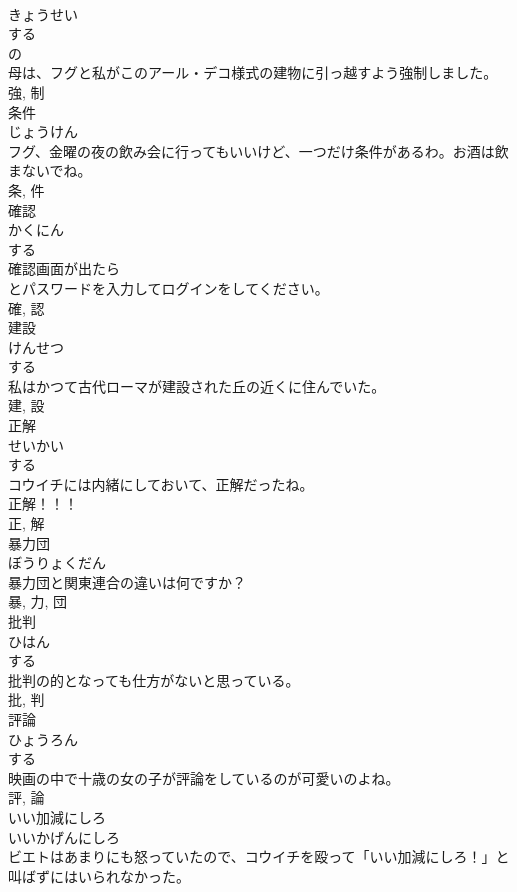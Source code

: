 \documentclass[8pt]{extreport}
\begin{document}
\begin{CJK}{UTF8}{min}
\\	きょうせい	
\\	する 
\\	の 
\\	母は、フグと私がこのアール・デコ様式の建物に引っ越すよう強制しました。	
\\	強, 制	
\\	条件	
\\	じょうけん	
\\	フグ、金曜の夜の飲み会に行ってもいいけど、一つだけ条件があるわ。お酒は飲まないでね。	
\\	条, 件	
\\	確認	
\\	かくにん	
\\	する 
\\	確認画面が出たら
\\	とパスワードを入力してログインをしてください。	
\\	確, 認	
\\	建設	
\\	けんせつ	
\\	する 
\\	私はかつて古代ローマが建設された丘の近くに住んでいた。	
\\	建, 設	
\\	正解	
\\	せいかい	
\\	する 
\\	コウイチには内緒にしておいて、正解だったね。	
\\	正解！！！	
\\	正, 解	
\\	暴力団	
\\	ぼうりょくだん	
\\	暴力団と関東連合の違いは何ですか？	
\\	暴, 力, 団	
\\	批判	
\\	ひはん	
\\	する 
\\	批判の的となっても仕方がないと思っている。	
\\	批, 判	
\\	評論	
\\	ひょうろん	
\\	する 
\\	映画の中で十歳の女の子が評論をしているのが可愛いのよね。	
\\	評, 論	
\\	いい加減にしろ	
\\	いいかげんにしろ	
\\	ビエトはあまりにも怒っていたので、コウイチを殴って「いい加減にしろ！」と叫ばずにはいられなかった。	

\end{CJK}
\end{document}
